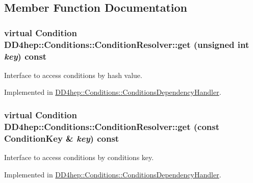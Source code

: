 \subsection{Member Function Documentation}
\hypertarget{class_d_d4hep_1_1_conditions_1_1_condition_resolver_ac321d32bbe1d5e777859c2490c68b571}{
\subsubsection[{get}]{\setlength{\rightskip}{0pt plus 5cm}virtual {\bf Condition} DD4hep::Conditions::ConditionResolver::get (unsigned int {\em key}) const}}
\label{class_d_d4hep_1_1_conditions_1_1_condition_resolver_ac321d32bbe1d5e777859c2490c68b571}


Interface to access conditions by hash value. 

Implemented in \hyperlink{class_d_d4hep_1_1_conditions_1_1_conditions_dependency_handler_aff162f6a84d33587bce982b60b259d14}{DD4hep::Conditions::ConditionsDependencyHandler}.\hypertarget{class_d_d4hep_1_1_conditions_1_1_condition_resolver_a8d33b49336349b3cf4877244572f1827}{
\subsubsection[{get}]{\setlength{\rightskip}{0pt plus 5cm}virtual {\bf Condition} DD4hep::Conditions::ConditionResolver::get (const {\bf ConditionKey} \& {\em key}) const}}
\label{class_d_d4hep_1_1_conditions_1_1_condition_resolver_a8d33b49336349b3cf4877244572f1827}


Interface to access conditions by conditions key. 

Implemented in \hyperlink{class_d_d4hep_1_1_conditions_1_1_conditions_dependency_handler_a76eb4e4234146f775b4c32396acad7f8}{DD4hep::Conditions::ConditionsDependencyHandler}.


